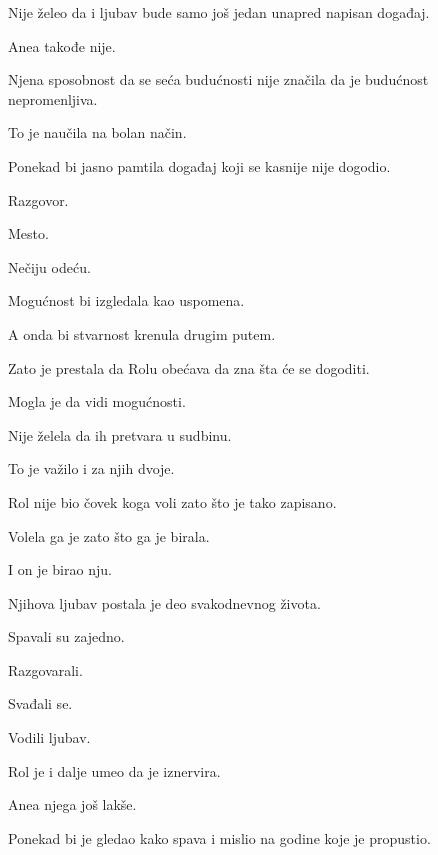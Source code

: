\bigskip

Nije želeo da i ljubav bude samo još jedan unapred napisan događaj.

\bigskip

Anea takođe nije.

\bigskip

Njena sposobnost da se seća budućnosti nije značila da je budućnost nepromenljiva.

To je naučila na bolan način.

\bigskip

Ponekad bi jasno pamtila događaj koji se kasnije nije dogodio.

Razgovor.

Mesto.

Nečiju odeću.

\bigskip

Mogućnost bi izgledala kao uspomena.

A onda bi stvarnost krenula drugim putem.

\bigskip

Zato je prestala da Rolu obećava da zna šta će se dogoditi.

\bigskip

Mogla je da vidi mogućnosti.

Nije želela da ih pretvara u sudbinu.

\bigskip

To je važilo i za njih dvoje.

\bigskip

Rol nije bio čovek koga voli zato što je tako zapisano.

\bigskip

Volela ga je zato što ga je birala.

\bigskip

I on je birao nju.

\bigskip

Njihova ljubav postala je deo svakodnevnog života.

Spavali su zajedno.

Razgovarali.

Svađali se.

Vodili ljubav.

\bigskip

Rol je i dalje umeo da je iznervira.

Anea njega još lakše.

\bigskip

Ponekad bi je gledao kako spava i mislio na godine koje je propustio.

